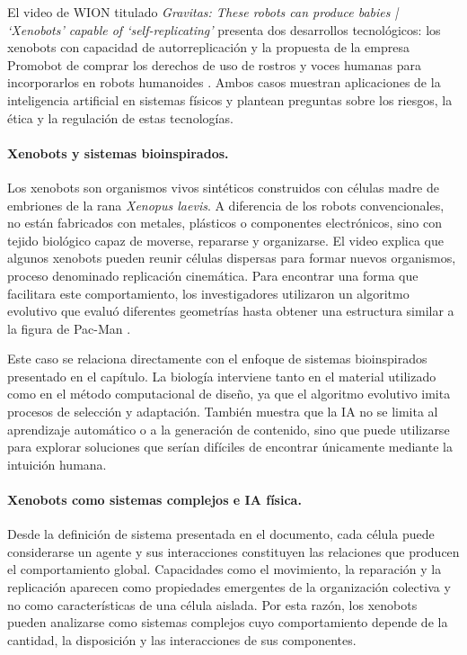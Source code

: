 \documentclass[14pt,twoside]{article}
\begin{document}
El video de WION titulado \textit{Gravitas: These robots can produce babies | `Xenobots' capable of `self-replicating'} presenta dos desarrollos tecnológicos: los xenobots con capacidad de autorreplicación y la propuesta de la empresa Promobot de comprar los derechos de uso de rostros y voces humanas para incorporarlos en robots humanoides \cite{wion2021}. Ambos casos muestran aplicaciones de la inteligencia artificial en sistemas físicos y plantean preguntas sobre los riesgos, la ética y la regulación de estas tecnologías.

\paragraph{Xenobots y sistemas bioinspirados.}

Los xenobots son organismos vivos sintéticos construidos con células madre de embriones de la rana \textit{Xenopus laevis}. A diferencia de los robots convencionales, no están fabricados con metales, plásticos o componentes electrónicos, sino con tejido biológico capaz de moverse, repararse y organizarse. El video explica que algunos xenobots pueden reunir células dispersas para formar nuevos organismos, proceso denominado replicación cinemática. Para encontrar una forma que facilitara este comportamiento, los investigadores utilizaron un algoritmo evolutivo que evaluó diferentes geometrías hasta obtener una estructura similar a la figura de Pac-Man \cite{wyss2021}.

Este caso se relaciona directamente con el enfoque de sistemas bioinspirados presentado en el capítulo. La biología interviene tanto en el material utilizado como en el método computacional de diseño, ya que el algoritmo evolutivo imita procesos de selección y adaptación. También muestra que la IA no se limita al aprendizaje automático o a la generación de contenido, sino que puede utilizarse para explorar soluciones que serían difíciles de encontrar únicamente mediante la intuición humana.

\paragraph{Xenobots como sistemas complejos e IA física.}

Desde la definición de sistema presentada en el documento, cada célula puede considerarse un agente y sus interacciones constituyen las relaciones que producen el comportamiento global. Capacidades como el movimiento, la reparación y la replicación aparecen como propiedades emergentes de la organización colectiva y no como características de una célula aislada. Por esta razón, los xenobots pueden analizarse como sistemas complejos cuyo comportamiento depende de la cantidad, la disposición y las interacciones de sus componentes.
\end{document}
